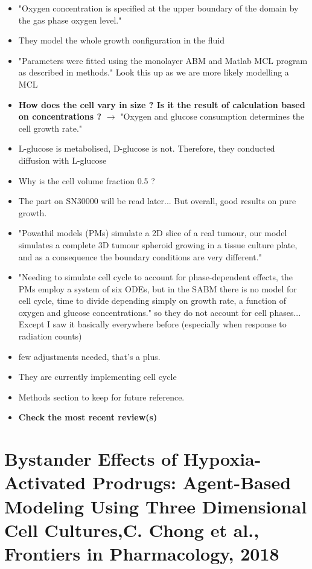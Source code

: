 \documentclass[11pt,a4paper]{article}
\begin{document}
\begin{itemize}
\item "Oxygen concentration is specified at the upper boundary of the domain by the gas phase oxygen level."
\item They model the whole growth configuration in the fluid 
\item "Parameters were fitted using the monolayer ABM and Matlab MCL program as described in methods." Look this up as we are more likely modelling a MCL
\item \textbf{How does the cell vary in size ? Is it the result of calculation based on concentrations ?} $\rightarrow$ "Oxygen and glucose consumption determines the cell growth rate."
\item L-glucose is metabolised, D-glucose is not. Therefore, they conducted diffusion with L-glucose
\item Why is the cell volume fraction 0.5 ?
\item The part on SN30000 will be read later... But overall, good results on pure growth.
\item "Powathil models (PMs) simulate a 2D slice of a real tumour, our model simulates a complete 3D tumour
spheroid growing in a tissue culture plate, and as a consequence the boundary conditions are
very different."
\item "Needing to simulate cell cycle to account for phase-dependent effects, the PMs employ a system of six ODEs, but in the SABM there is no model for cell cycle, time to divide depending simply on growth rate, a function of oxygen and glucose concentrations." so they do not account for cell phases... Except I saw it basically everywhere before (especially when response to radiation counts)
\item few adjustments needed, that's a plus.
\item  They are currently implementing cell cycle
\item Methods section to keep for future reference.
\item \textbf{Check the most recent review(s)}
\end{itemize}

\section*{Bystander Effects of Hypoxia-Activated Prodrugs: Agent-Based Modeling Using Three Dimensional Cell Cultures,C. Chong et al., Frontiers in Pharmacology, 2018}
\end{document}
